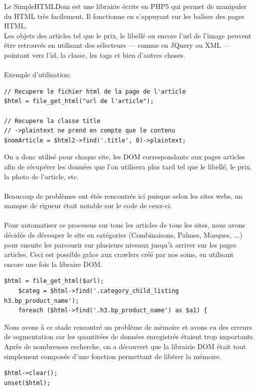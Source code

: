 \documentclass{report}
\begin{document}
Le SimpleHTMLDom est une librairie écrite en PHP5 qui permet de manipuler du HTML très facilement. Il fonctionne en s'appuyant sur les balises des pages HTML.\\
Les objets des articles tel que le prix, le libellé ou encore l'url de l'image peuvent être retrouvés en utilisant des sélecteurs — comme en JQuery ou XML — pointant vers l'id, la classe, les tags et bien d'autres choses.\\\\
Exemple d'utilisation: \\
\begin{lstlisting}
// Recupere le fichier html de la page de l'article
$html = file_get_html("url de l'article");

// Recupere la classe title
// ->plaintext ne prend en compte que le contenu
$nomArticle = $html2->find('.title', 0)->plaintext;
\end{lstlisting}

On a donc utilisé pour chaque site, les DOM correspondants aux pages articles afin de récupérer les données que l'on utilisera plus tard tel que le libellé, le prix, la photo de l'article, etc.\\\\
Beaucoup de problèmes ont étés rencontrés ici puisque selon les sites webs, un manque de rigueur était notable sur le code de ceux-ci.\\\\
Pour automatiser ce processus sur tous les articles de tous les sites, nous avons décidés de découper le site en catégories (Combinaisons, Palmes, Masques, ...) pour ensuite les parcourir sur plusieurs niveaux jusqu'à arriver sur les pages articles. Ceci est possible grâce aux crawlers créé par nos soins, en utilisant encore une fois la libraire DOM.
\begin{lstlisting}
$html = file_get_html($url);
	$categ = $html->find('.category_child_listing h3.bp_product_name');
	foreach ($html->find('.h3.bp_product_name') as $a1) {
\end{lstlisting}

Nous avons à ce stade rencontré un problème de mémoire et avons eu des erreurs de segmentation car les quantitées de données enregistrés étaient trop importants. Après de nombreuses recherche, on a découvert que la librairie DOM était tout simplement composée d'une fonction permettant de libérer la mémoire.
\begin{lstlisting}
$html->clear();
unset($html);
\end{lstlisting}
\end{document}
